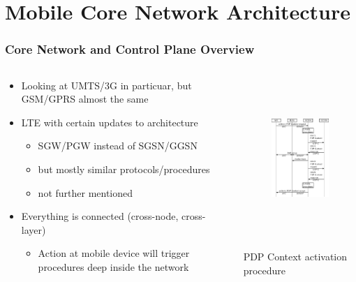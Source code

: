 \documentclass{beamer}
\begin{document}
\section{Mobile Core Network Architecture}

\begin{frame}
	\frametitle{Core Network and Control Plane Overview}


    \begin{columns}[T]
    	\begin{column}[T]{5cm}
			\begin{itemize}
				\item Looking at UMTS/3G in particuar, but GSM/GPRS almost the same
				\item LTE with certain updates to architecture
					\begin{itemize}
						\item SGW/PGW instead of SGSN/GGSN
						\item but mostly similar protocols/procedures
						\item not further mentioned
					\end{itemize}

				\item Everything is connected (cross-node, cross-layer)
					\begin{itemize}
						\item Action at mobile device will trigger procedures deep inside the network
					\end{itemize}

			\end{itemize}
		\end{column}

    	\begin{column}[T]{5cm}
			\begin{figure}
				\centering
				\includegraphics[height=6cm]{../../chapters/04-mobilenets/images/pdp-context-activation-procedure.pdf}
			\end{figure}
			\vspace{-0.5cm}
			{\small PDP Context activation procedure}
		\end{column}
	\end{columns}
\end{frame}
\end{document}
